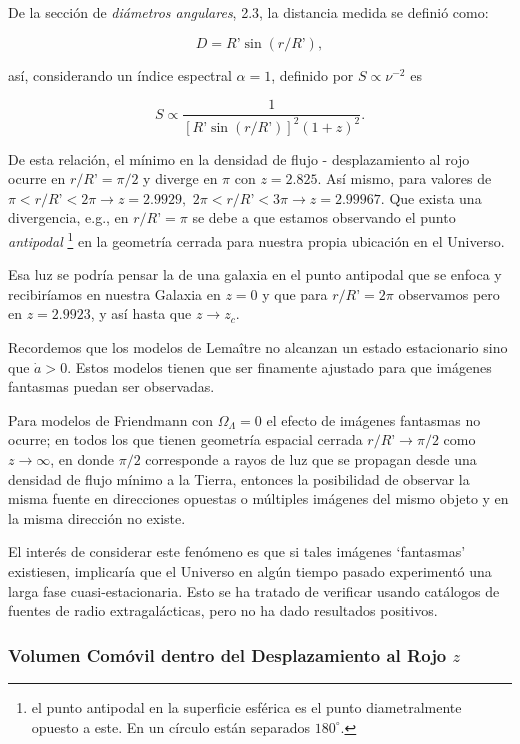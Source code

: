 \documentclass[11pt]{article}
\begin{document}
    \newpage
    
    De la sección de {\textit{diámetros angulares}}, 2.3, la distancia medida se definió como:

\begin{equation}
	D = R’ \sin(r/R’),
\end{equation}
    
    así, considerando un índice espectral $\alpha = 1$, definido por $S \propto \nu^{-2}$ es

\begin{equation}
	S \propto	\frac{1}{[R’ \sin(r/R’)]^2 (1+z)^2}.
\end{equation}
     
     De esta relación, el mínimo en la densidad de flujo -  desplazamiento al rojo ocurre en $r/R’= \pi/2$ y diverge en $\pi$ con $z= 2.825$. Así mismo, para valores de $\pi < r/R’ < 2 \pi \rightarrow{z = 2.9929}, \, \, 2 \pi < r/R’ < 3 \pi \rightarrow{z = 2.99967}$. Que exista una divergencia, e.g., en $r/R’ = \pi$ se debe a que estamos observando el punto {\textit{antipodal}} {\footnote{el punto antipodal en la superficie esférica es el punto diametralmente opuesto a este. En un círculo están separados $180^{\circ}$. }} en la geometría cerrada para nuestra propia ubicación en el Universo.
    
   Esa luz se podría pensar  la de una galaxia en el punto antipodal que se enfoca y recibiríamos en nuestra Galaxia en $z=0$ y que para $r/R’ = 2  \pi$ observamos pero en $z=2.9923$, y así hasta que $z \rightarrow{z_c}$.  

Recordemos que los modelos de Lema\^itre no alcanzan un estado estacionario sino que $\dot{a} > 0$. Estos modelos tienen que ser finamente ajustado para que imágenes fantasmas puedan ser observadas. 

    
    Para modelos de Friendmann con $\Omega_{\Lambda} =0$ el efecto de imágenes fantasmas no ocurre; en todos los que tienen geometría espacial cerrada $r/R’ \rightarrow{\pi/2}$ como $z \rightarrow{\infty}$, en donde $\pi/2$ corresponde a rayos de luz que se propagan desde una densidad de flujo mínimo a la Tierra, entonces la posibilidad de observar la misma fuente en direcciones opuestas o múltiples imágenes del mismo objeto y en la misma dirección no existe. 
    
    El interés de considerar este fenómeno es que si tales imágenes `fantasmas’ existiesen, implicaría que el Universo en algún tiempo pasado experimentó una larga fase cuasi-estacionaria. Esto se ha tratado de verificar usando catálogos de fuentes de radio extragalácticas, pero no ha dado resultados positivos. 



\subsubsection{Volumen Comóvil dentro del Desplazamiento al Rojo $z$}
    
    
    
    
    
    
    
    
    
    
    
\end{document}
